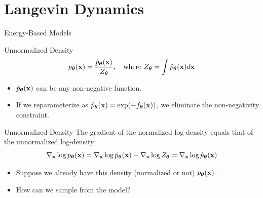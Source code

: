 \documentclass{beamer}
\begin{document}
\section{Langevin Dynamics}
\begin{frame}{Energy-Based Models}
	\begin{block}{Unnormalized Density}
		\vspace{-0.2cm}
		\[
			p_{\boldsymbol{\theta}}(\mathbf{x}) = \frac{\hat{p}_{\boldsymbol{\theta}}(\mathbf{x})}{Z_{\boldsymbol{\theta}}}, \quad \text{where } Z_{\boldsymbol{\theta}} = \int \hat{p}_{\boldsymbol{\theta}}(\mathbf{x}) d \mathbf{x}
		\]
		\vspace{-0.3cm}
		\begin{itemize}
			\item $\hat{p}_{\boldsymbol{\theta}}(\mathbf{x})$ can be any non-negative function. \\
			\item If we reparameterize as $\hat{p}_{\boldsymbol{\theta}}(\mathbf{x}) = \exp(-f_{\boldsymbol{\theta}}(\mathbf{x}))$, we eliminate the non-negativity constraint.
		\end{itemize}
	\end{block}
	\eqpause
	\vspace{-0.3cm}
	\begin{block}{Unnormalized Density}
		The gradient of the normalized log-density equals that of the unnormalized log-density:
		\[
			\nabla_{\mathbf{x}} \log p_{\boldsymbol{\theta}}(\mathbf{x}) = \nabla_{\mathbf{x}} \log \hat{p}_{\boldsymbol{\theta}}(\mathbf{x}) - \nabla_{\mathbf{x}} \log Z_{\boldsymbol{\theta}} = \nabla_{\mathbf{x}} \log \hat{p}_{\boldsymbol{\theta}}(\mathbf{x})
		\]
	\end{block}
	\eqpause
	\vspace{-0.3cm}
	\begin{itemize}
		\item Suppose we already have this density (normalized or not) $p_{\boldsymbol{\theta}}(\mathbf{x})$.
		\item How can we sample from the model?
	\end{itemize}
\end{frame}
\end{document}
